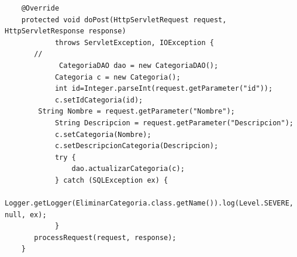\documentclass[10pt,a4paper]{article}
\begin{document}
\begin{lstlisting}
    @Override
    protected void doPost(HttpServletRequest request, HttpServletResponse response)
            throws ServletException, IOException {
       //
             CategoriaDAO dao = new CategoriaDAO();
            Categoria c = new Categoria();
            int id=Integer.parseInt(request.getParameter("id"));
            c.setIdCategoria(id);
        String Nombre = request.getParameter("Nombre");
            String Descripcion = request.getParameter("Descripcion");
            c.setCategoria(Nombre);
            c.setDescripcionCategoria(Descripcion);
            try {
                dao.actualizarCategoria(c);
            } catch (SQLException ex) {
                Logger.getLogger(EliminarCategoria.class.getName()).log(Level.SEVERE, null, ex);
            }
       processRequest(request, response);
    }
\end{lstlisting} \hfill
\end{document}
